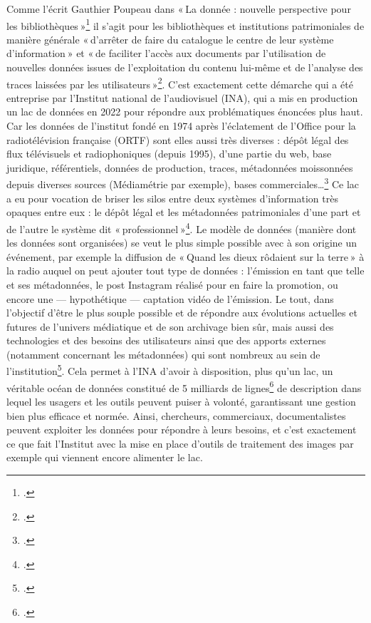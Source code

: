 Comme l’écrit Gauthier Poupeau dans « La donnée : nouvelle perspective pour les bibliothèques »\footcite{poupeau_donnee_2016} il s’agit pour les bibliothèques et institutions patrimoniales de manière générale « d’arrêter de faire du catalogue le centre de leur système d’information » et « de faciliter l’accès aux documents par l’utilisation de nouvelles données issues de l’exploitation du contenu lui-même et de l’analyse des traces laissées par les utilisateurs »\footcite[§ 3]{poupeau_donnee_2016}. C’est exactement cette démarche qui a été entreprise par l’Institut national de l’audiovisuel (INA), qui a mis en production un lac de données en 2022 pour répondre aux problématiques énoncées plus haut. Car les données de l’institut fondé en 1974 après l’éclatement de l’Office pour la radiotélévision française (ORTF) sont elles aussi très diverses : dépôt légal des flux télévisuels et radiophoniques (depuis 1995), d’une partie du web, base juridique, référentiels, données de production, traces, métadonnées moissonnées depuis diverses sources (Médiamétrie par exemple), bases commerciales…\footcite{alquier2024} Ce lac a eu pour vocation de briser les silos entre deux systèmes d’information très opaques entre eux : le dépôt légal et les métadonnées patrimoniales d’une part et de l’autre le système dit « professionnel »\footcite[p. 195]{dribault_dujardin_levolution_2020}. Le modèle de données (manière dont les données sont organisées) se veut le plus simple possible avec à son origine un événement, par exemple la diffusion de « Quand les dieux rôdaient sur la terre » à la radio auquel on peut ajouter tout type de données : l’émission en tant que telle et ses métadonnées, le post Instagram réalisé pour en faire la promotion, ou encore une — hypothétique — captation vidéo de l’émission. Le tout, dans l’objectif d’être le plus souple possible et de répondre aux évolutions actuelles et futures de l’univers médiatique et de son archivage bien sûr, mais aussi des technologies et des besoins des utilisateurs ainsi que des apports externes (notamment concernant les métadonnées) qui sont nombreux au sein de l’institution\footcite[p. 198]{dribault_dujardin_levolution_2020}. Cela permet à l’INA d’avoir à disposition, plus qu’un lac, un véritable océan de données constitué de 5 milliards de lignes\footcite{alquier2024} de description dans lequel les usagers et les outils peuvent puiser à volonté, garantissant une gestion bien plus efficace et normée. Ainsi, chercheurs, commerciaux, documentalistes peuvent exploiter les données pour répondre à leurs besoins, et c’est exactement ce que fait l’Institut avec la mise en place d’outils de traitement des images par exemple qui viennent encore alimenter le lac.


